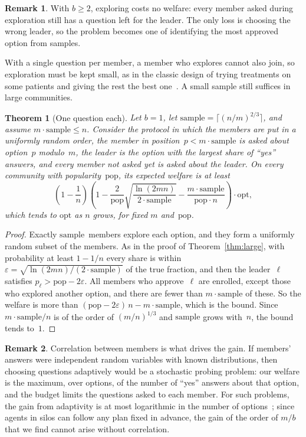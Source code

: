 \documentclass[11pt]{article}
\newtheorem{theorem}{Theorem}
\theoremstyle{definition}
\newtheorem{remark}{Remark}
\newcommand{\opt}{\mathrm{opt}}
\newcommand{\pop}{\mathrm{pop}}
\newcommand{\sample}{\mathrm{sample}}
\begin{document}
\begin{remark}
With $b \ge 2$, exploring costs no welfare: every member asked during exploration still has a question left for the leader.
The only loss is choosing the wrong leader, so the problem becomes one of identifying the most approved option from samples.
\end{remark}

With a single question per member, a member who explores cannot also join, so exploration must be kept small, as in the classic design of trying treatments on some patients and giving the rest the best one~\cite{colton1963model}.
A small sample still suffices in large communities.

\begin{theorem}[One question each]\label{thm:one}
Let $b = 1$, let $\sample = \lceil (n/m)^{2/3} \rceil$, and assume $m \cdot \sample \le n$.
Consider the protocol in which the members are put in a uniformly random order, the member in position~$p < m \cdot \sample$ is asked about option~$p$ modulo~$m$, the leader is the option with the largest share of ``yes'' answers, and every member not asked yet is asked about the leader.
On every community with popularity~$\pop$, its expected welfare is at least
\[
\left(1 - \frac{1}{n}\right)\left(1 - \frac{2}{\pop}\sqrt{\frac{\ln(2mn)}{2\cdot\sample}} - \frac{m\cdot\sample}{\pop\cdot n}\right)\cdot \opt ,
\]
which tends to $\opt$ as $n$ grows, for fixed $m$ and~$\pop$.
\end{theorem}

\begin{proof}
Exactly $\sample$~members explore each option, and they form a uniformly random subset of the members.
As in the proof of Theorem~\ref{thm:large}, with probability at least $1 - 1/n$ every share is within $\varepsilon = \sqrt{\ln(2mn)/(2\cdot\sample)}$ of the true fraction, and then the leader~$\ell$ satisfies $p_\ell > \pop - 2\varepsilon$.
All members who approve~$\ell$ are enrolled, except those who explored another option, and there are fewer than $m \cdot \sample$ of these.
So the welfare is more than $(\pop - 2\varepsilon)\, n - m\cdot\sample$, which is the bound.
Since $m \cdot \sample / n$ is of the order of $(m/n)^{1/3}$ and $\sample$ grows with~$n$, the bound tends to~$1$.
\end{proof}

\begin{remark}
Correlation between members is what drives the gain.
If members' answers were independent random variables with known distributions, then choosing questions adaptively would be a stochastic probing problem: our welfare is the maximum, over options, of the number of ``yes'' answers about that option, and the budget limits the questions asked to each member.
For such problems, the gain from adaptivity is at most logarithmic in the number of options~\cite{gupta2016adaptivity}; since agents in silos can follow any plan fixed in advance, the gain of the order of $m/b$ that we find cannot arise without correlation.
\end{remark}
\end{document}
